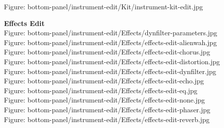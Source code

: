 \documentclass[
 11pt,
 twoside,
 a4paper,
 headinclude,
 footinclude,
 final                                 %
]{article}
\begin{document}
\begin{enumber}
\begin{enumber}
         Figure: bottom-panel/instrument-edit/Kit/instrument-kit-edit.jpg
      \item \textbf{Effects Edit} \\
         Figure: bottom-panel/instrument-edit/Effects/dynfilter-parameters.jpg \\
         Figure: bottom-panel/instrument-edit/Effects/effects-edit-alienwah.jpg \\
         Figure: bottom-panel/instrument-edit/Effects/effects-edit-chorus.jpg \\
         Figure: bottom-panel/instrument-edit/Effects/effects-edit-distortion.jpg \\
         Figure: bottom-panel/instrument-edit/Effects/effects-edit-dynfilter.jpg \\
         Figure: bottom-panel/instrument-edit/Effects/effects-edit-echo.jpg \\
         Figure: bottom-panel/instrument-edit/Effects/effects-edit-eq.jpg \\
         Figure: bottom-panel/instrument-edit/Effects/effects-edit-none.jpg \\
         Figure: bottom-panel/instrument-edit/Effects/effects-edit-phaser.jpg \\
         Figure: bottom-panel/instrument-edit/Effects/effects-edit-reverb.jpg
   \end{enumber}                    %

\end{enumber}
\end{document}
